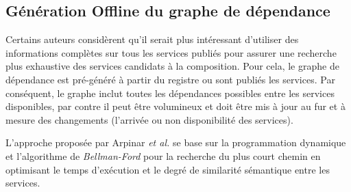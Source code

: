   \subsection{Génération Offline du graphe de dépendance}
  \label{sec:gener-offline}
  \begin{text}
    Certains auteurs considèrent qu'il serait plus intéressant
    d'utiliser des informations complètes sur tous les services
    publiés pour assurer une recherche plus exhaustive des services
    candidats à la composition. Pour cela, le graphe de dépendance
    est pré-généré à partir du registre ou sont publiés les
    services. Par conséquent, le graphe inclut toutes les dépendances
    possibles entre les services disponibles, par contre il peut être
    volumineux et doit être mis à jour au fur et à mesure des
    changements (l'arrivée ou non disponibilité des services).
  \end{text}

  \begin{text}
    L'approche proposée par Arpinar \textit{et al.}
    \cite{arpinar2005ontology} se base sur la programmation dynamique
    et l'algorithme de \textit{Bellman-Ford} pour la recherche du plus
    court chemin en optimisant le temps d'exécution et le degré de
    similarité sémantique entre les services.

  \end{text}

